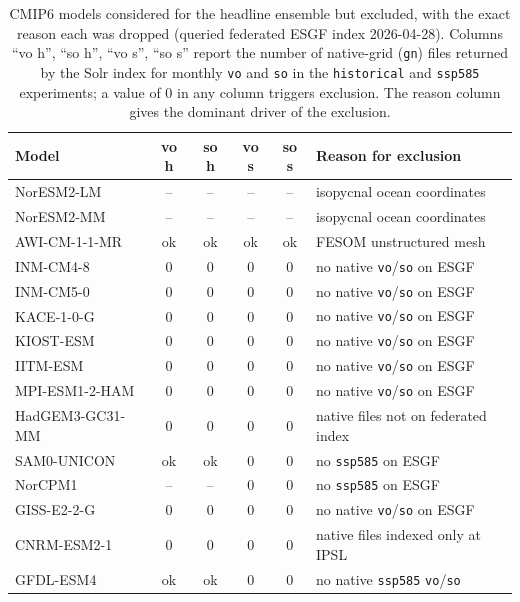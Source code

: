\documentclass[10pt,a4paper]{article}
\begin{document}
\begin{table}[h]
\centering
\footnotesize
\caption{CMIP6 models considered for the headline ensemble but excluded, with the exact reason each was dropped (queried federated ESGF index 2026-04-28). Columns ``vo h'', ``so h'', ``vo s'', ``so s'' report the number of native-grid (\texttt{gn}) files returned by the Solr index for monthly \texttt{vo} and \texttt{so} in the \texttt{historical} and \texttt{ssp585} experiments; a value of 0 in any column triggers exclusion. The reason column gives the dominant driver of the exclusion.}
\label{tab:excluded_models}
\begin{tabular}{l c c c c l}
\toprule
\textbf{Model} & \textbf{vo h} & \textbf{so h} & \textbf{vo s} & \textbf{so s} & \textbf{Reason for exclusion} \\
\midrule
NorESM2-LM        & --  & --  & --  & --  & isopycnal ocean coordinates \\
NorESM2-MM        & --  & --  & --  & --  & isopycnal ocean coordinates \\
AWI-CM-1-1-MR     & ok  & ok  & ok  & ok  & FESOM unstructured mesh \\
INM-CM4-8         & 0   & 0   & 0   & 0   & no native \texttt{vo}/\texttt{so} on ESGF \\
INM-CM5-0         & 0   & 0   & 0   & 0   & no native \texttt{vo}/\texttt{so} on ESGF \\
KACE-1-0-G        & 0   & 0   & 0   & 0   & no native \texttt{vo}/\texttt{so} on ESGF \\
KIOST-ESM         & 0   & 0   & 0   & 0   & no native \texttt{vo}/\texttt{so} on ESGF \\
IITM-ESM          & 0   & 0   & 0   & 0   & no native \texttt{vo}/\texttt{so} on ESGF \\
MPI-ESM1-2-HAM    & 0   & 0   & 0   & 0   & no native \texttt{vo}/\texttt{so} on ESGF \\
HadGEM3-GC31-MM   & 0   & 0   & 0   & 0   & native files not on federated index \\
SAM0-UNICON       & ok  & ok  & 0   & 0   & no \texttt{ssp585} on ESGF \\
NorCPM1           & --  & --  & 0   & 0   & no \texttt{ssp585} on ESGF \\
GISS-E2-2-G       & 0   & 0   & 0   & 0   & no native \texttt{vo}/\texttt{so} on ESGF \\
CNRM-ESM2-1       & 0   & 0   & 0   & 0   & native files indexed only at IPSL \\
GFDL-ESM4         & ok  & ok  & 0   & 0   & no native \texttt{ssp585} \texttt{vo}/\texttt{so} \\

\end{tabular}
\end{table}
\end{document}

